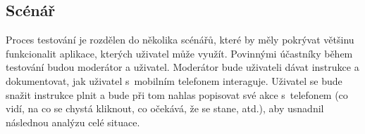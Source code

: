 \subsection{Scénář}

Proces testování je rozdělen do několika scénářů, které by měly pokrývat většinu funkcionalit aplikace, kterých uživatel může využít. Povinnými účastníky během testování budou moderátor a uživatel. Moderátor bude uživateli dávat instrukce a dokumentovat, jak uživatel s~mobilním telefonem interaguje. Uživatel se bude snažit instrukce plnit a bude při tom nahlas popisovat své akce s~telefonem (co vidí, na co se chystá kliknout, co očekává, že se stane, atd.), aby usnadnil následnou analýzu celé situace.

